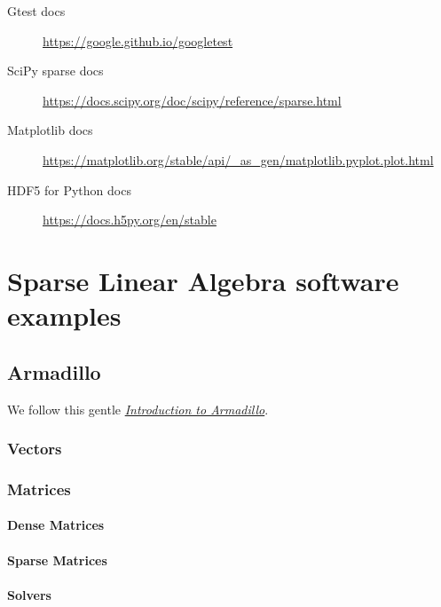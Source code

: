 \begin{description}
	\item[Gtest docs]

	      \url{https://google.github.io/googletest}

	\item[SciPy sparse docs]

	      \url{https://docs.scipy.org/doc/scipy/reference/sparse.html}

	\item[Matplotlib docs]

	      \url{https://matplotlib.org/stable/api/_as_gen/matplotlib.pyplot.plot.html}

	\item[HDF5 for Python docs]
	      \url{https://docs.h5py.org/en/stable}
\end{description}

\chapter{Sparse Linear Algebra software examples}

\section{Armadillo}

We follow this gentle
\href{https://anderkve.github.io/FYS3150/book/introduction_to_cpp/intro_to_armadillo.html}{\emph{Introduction to Armadillo}}.

\subsection{Vectors}

\subsection{Matrices}

\subsubsection{Dense Matrices}

\subsubsection{Sparse Matrices}

\subsubsection{Solvers}

